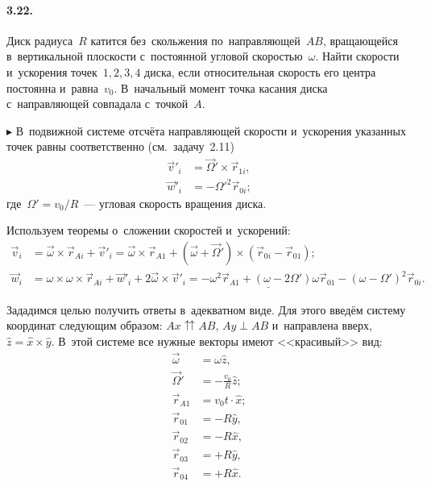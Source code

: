 \documentclass{weekly}
\begin{document}
\paragraph{3.22.} Диск радиуса~$R$ катится без~скольжения
по~направляющей~$AB$, вращающейся в~вертикальной плоскости
с~постоянной угловой скоростью~$\omega$. Найти скорости
и~ускорения точек~$1, 2, 3, 4$ диска, если относительная
скорость его центра постоянна и~равна~$v_0$.
В~начальный момент точка касания диска с~направляющей
совпадала с~точкой~$A$.

$\blacktriangleright$ В~подвижной системе отсчёта направляющей
скорости и~ускорения указанных точек
равны соответственно (см.~задачу~2.11)
\begin{align}
    \vec v'_i &= \vec\Omega' \times \vec r_{1i}, \\
    \vec w'_i &= -\Omega'^2 \vec r_{0i};
\end{align}
где~$\Omega' = v_0/R$~--- угловая скорость вращения диска.

Используем теоремы о~сложении скоростей и~ускорений:
\begin{align}
    \vec v_i &= \vec\omega \times \vec r_{Ai} + \vec v'_i
        = \vec\omega \times \vec r_{A1} +
            \left(\vec\omega + \vec\Omega'\right) \times
            \left(\vec r_{0i} - \vec r_{01}\right);
        \label{3.22:vi}
\\
    \vec w_i &= \omega \times \omega \times \vec r_{Ai} + \vec w'_i +
            2\vec\omega \times \vec v'_i
        = \underline{-\omega^2 \vec r_{A1} +
            \left(\omega - 2\Omega'\right)\omega \vec r_{01}} -
            \left(\omega - \Omega'\right)^2 \vec r_{0i}.
        \label{3.22:wi}
\end{align}

Зададимся целью получить ответы в~адекватном виде.
Для этого введём систему координат следующим образом:
$Ax \upuparrows AB$, $Ay \perp AB$ и~направлена вверх,
$\hat z = \hat x \times \hat y$.
В~этой системе все нужные векторы имеют <<красивый>> вид:
\begin{align}
    \vec\omega &= \omega \hat z, \\
    \vec\Omega' &= -\frac{v_0}{R} \hat z; \\[1.5ex]
    \vec r_{A1} &= v_0 t \cdot \hat x;\\
    \vec r_{01} &= -R \hat y, \\
    \vec r_{02} &= -R \hat x, \\
    \vec r_{03} &= +R \hat y, \\
    \vec r_{04} &= +R \hat x.
\end{align}
\end{document}

